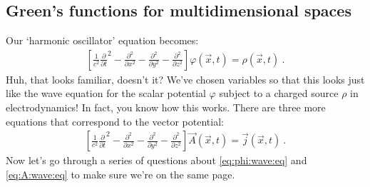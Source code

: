\subsection{Green's functions for multidimensional spaces}
Our `harmonic oscillator' equation becomes:
\begin{align}
	\left[\frac{1}{c^2}
			\frac{\partial}{\partial t}^2
			-
			\frac{\partial^2}
			{\partial x^2}
			-
			\frac{\partial^2}
			{\partial y^2}
			-
			\frac{\partial^2}
			{\partial z^2}
		\right]
		\varphi(\vec{x},t) = \rho(\vec{x},t) \ .
		\label{eq:phi:wave:eq}
\end{align}
Huh, that looks familiar, doesn't it? We've chosen variables so that this looks just like the wave equation for the scalar potential $\varphi$ subject to a charged source $\rho$ in electrodynamics! In fact, you know how this works. There are three more equations that correspond to the vector potential:
\begin{align}
	\left[\frac{1}{c^2}
			\frac{\partial}{\partial t}^2
			-
			\frac{\partial^2}
			{\partial x^2}
			-
			\frac{\partial^2}
			{\partial y^2}
			-
			\frac{\partial^2}
			{\partial z^2}
		\right]
		\vec A(\vec{x},t) = \vec j(\vec{x},t) \ .
		\label{eq:A:wave:eq}
\end{align}
Now let's go through a series of questions about \eqref{eq:phi:wave:eq} and \eqref{eq:A:wave:eq} to make sure we're on the same page. 
